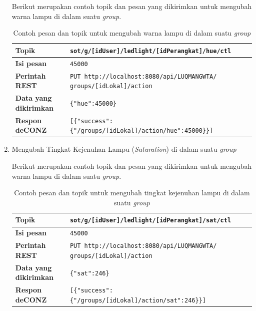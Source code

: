 \begin{enumerate}
	Berikut merupakan contoh topik dan pesan yang dikirimkan untuk mengubah warna lampu di dalam suatu \textit{group}.
	
	\begin{table}
		\centering
		\caption{Contoh pesan dan topik untuk mengubah warna lampu di dalam suatu \textit{group}}
		\label{tab:hueLampuInGroup}
		\begin{tabular}{| l | p{11cm} |}
			\hline
			\textbf{Topik} & \texttt{sot/g/[idUser]/ledlight/[idPerangkat]/hue/ctl} \\
			\hline
			\textbf{Isi pesan} & \texttt{45000} \\
			\hline
			\textbf{Perintah REST} & \texttt{PUT http://localhost:8080/api/LUQMANGWTA/ groups/[idLokal]/action} \\
			\hline
			\textbf{Data yang dikirimkan} & \texttt{\{"hue":45000\}} \\
			\hline
			\textbf{Respon deCONZ} & \texttt{[\{"success":\{"/groups/[idLokal]/action/hue":45000\}\}]} \\
			\hline
		\end{tabular}
	\end{table}
	
	\item Mengubah Tingkat Kejenuhan Lampu (\textit{Saturation}) di dalam suatu \textit{group}
	
	Berikut merupakan contoh topik dan pesan yang dikirimkan untuk mengubah warna lampu di dalam suatu \textit{group}.
	
	\begin{table}
		\centering
		\caption{Contoh pesan dan topik untuk mengubah tingkat kejenuhan lampu di dalam suatu \textit{group}}
		\label{tab:satLampuInGroup}
		\begin{tabular}{| l | p{11cm} |}
			\hline
			\textbf{Topik} & \texttt{sot/g/[idUser]/ledlight/[idPerangkat]/sat/ctl} \\
			\hline
			\textbf{Isi pesan} & \texttt{45000} \\
			\hline
			\textbf{Perintah REST} & \texttt{PUT http://localhost:8080/api/LUQMANGWTA/ groups/[idLokal]/action} \\
			\hline
			\textbf{Data yang dikirimkan} & \texttt{\{"sat":246\}} \\
			\hline
			\textbf{Respon deCONZ} & \texttt{[\{"success":\{"/groups/[idLokal]/action/sat":246\}\}]} \\
			\hline
		\end{tabular}
	\end{table}
	
\end{enumerate}

